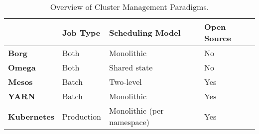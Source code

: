 
\begin{table}[]
\centering
\caption{Overview of Cluster Management
Paradigms.}\label{table:cluster-management-paradigms-comparison-table}
\begin{tabular}{|l|l|l|l|}
\hline
                    & \textbf{Job Type} & \textbf{Scheduling Model} &
                      \textbf{Open Source} \\ \hline
\textbf{Borg \cite{borg}}       & Both              & Monolithic                & No
\\ \hline
\textbf{Omega \cite{omega}}      & Both              & Shared state              & No
\\ \hline
\textbf{Mesos \cite{mesos}}      & Batch             & Two-level                 & Yes
\\ \hline
\textbf{YARN \cite{yarn}}       & Batch             & Monolithic                & Yes
\\ \hline
\textbf{Kubernetes \cite{k8s-website}} & Production  & Monolithic (per namespace)                & Yes
\\ \hline
\end{tabular}
\end{table}

